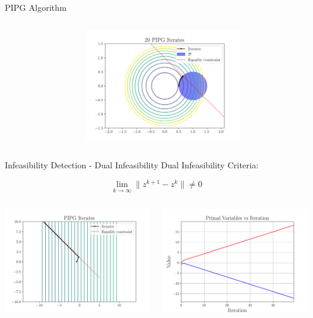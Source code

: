 \documentclass[aspectratio=169]{beamer}
\begin{document}
\begin{frame}{PIPG Algorithm}
\begin{columns}[T]
\begin{column}{.5\textwidth}
        \end{column}
        \begin{column}{.5\textwidth}
            \includegraphics[width=6.75cm]{img/actual_pipg_iterates.png}
        \end{column}
    \end{columns}
\end{frame}

\begin{frame}{Infeasibility Detection - Dual Infeasibility}
    Dual Infeasibility Criteria: 
    
    \[\lim_{k\to\infty} \|z^{k+1}-z^k\| \neq 0\]
    \begin{columns}[T]
        \begin{column}{.5\textwidth}
            \includegraphics[width=7cm]{img/dual_infeas_pipg_iters.png}
        \end{column}
        \begin{column}{.5\textwidth}
            \includegraphics[width=7cm]{img/dual_infeas_prim_iters.png}
        \end{column}
    \end{columns}
\end{frame}
\end{document}
